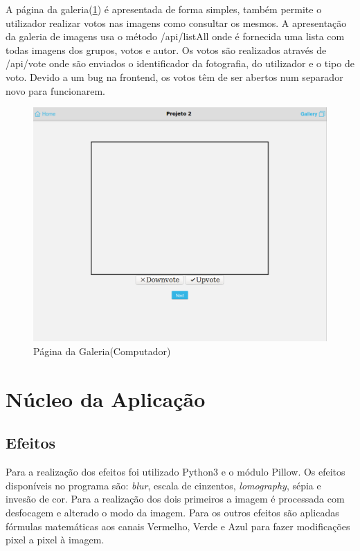 \documentclass{report}
\begin{document}
A página da galeria(\ref{GalPag}) é apresentada de forma simples, também permite o utilizador realizar votos nas imagens como consultar os mesmos. A apresentação da galeria de imagens usa o método /api/listAll onde é fornecida uma lista com todas imagens dos grupos, votos e autor. Os votos são realizados através de /api/vote onde são enviados o identificador da fotografia, do utilizador e o tipo de voto.
Devido a um bug na frontend, os votos têm de ser abertos num separador novo para funcionarem.
\begin{figure}[b]
 \center
 \includegraphics[scale=0.5]{final_gallery.png}
 \caption{Página da Galeria(Computador)}
 \label{GalPag}
\end{figure}

\section{Núcleo da Aplicação}

\subsection{Efeitos}

Para a realização dos efeitos foi utilizado Python3 e o módulo Pillow.
Os efeitos disponíveis no programa são: \textit{blur}, escala de cinzentos, \textit{lomography}, sépia e invesão de cor. Para a realização dos dois primeiros a imagem é processada com desfocagem e alterado o modo da imagem. Para os outros efeitos são aplicadas fórmulas matemáticas aos canais Vermelho, Verde e Azul para fazer modificações pixel a pixel à imagem.
\end{document}
